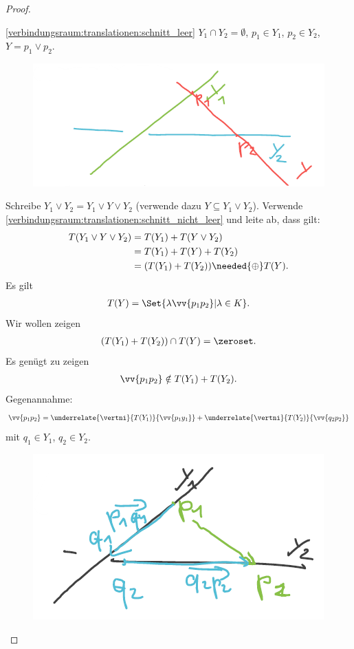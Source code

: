 \begin{proof}
\begin{proofdescription}
         \item[\ref{verbindungsraum:translationen:schnitt_leer}]
         \( Y_1\cap Y_2=\emptyset \), \( p_1\in Y_1 \), \( p_2\in Y_2 \), \( Y=p_1\vee p_2 \).
         \begin{figure}[H]
             \centering
             \includegraphics[width=0.5\linewidth]{figures/verbindungsraum_translationen_schnitt_leer}
             \label{fig:verbindungsraum_translationen_schnitt_leer}
         \end{figure}
         Schreibe \( Y_1\vee Y_2=Y_1\vee Y\vee Y_2 \) (verwende dazu \( Y\subseteq Y_1\vee Y_2 \)).
         Verwende \ref{verbindungsraum:translationen:schnitt_nicht_leer} und leite ab, dass gilt:
         \begin{align*}
             T(Y_1\vee Y \vee Y_2)\begin{aligned}[t] 
                 &=T(Y_1)+T(Y\vee Y_2)\\
                 &=T(Y_1)+T(Y)+T(Y_2)\\
                 &=(T(Y_1)+T(Y_2))\needed{\oplus} T(Y).
             \end{aligned}
         \end{align*}
         Es gilt 
         \begin{align*}
             T(Y)=\Set{\lambda\vv{p_1 p_2}| \lambda\in K}.
         \end{align*}
         Wir wollen zeigen
         \begin{align*}
             (T(Y_1)+T(Y_2))\cap T(Y)=\zeroset.
         \end{align*}
         Es genügt zu zeigen
         \begin{align*}
             \vv{p_1 p_2}\notin T(Y_1)+T(Y_2).
         \end{align*}
         Gegenannahme:
         \begin{align*}
             \vv{p_1 p_2}=\underrelate{\vertni}{T(Y_1)}{\vv{p_1 y_1}}+\underrelate{\vertni}{T(Y_2)}{\vv{q_2 p_2}}
         \end{align*}
         mit \( q_1\in Y_1 \), \( q_2\in Y_2 \).
         \begin{figure}[H]
             \centering
             \includegraphics[width=0.5\linewidth]{figures/verbindungsraum_translationen_schnitt_leer_verbindungslinie_nicht_in_translationen}

\end{figure}
\end{proofdescription}
\end{proof}
